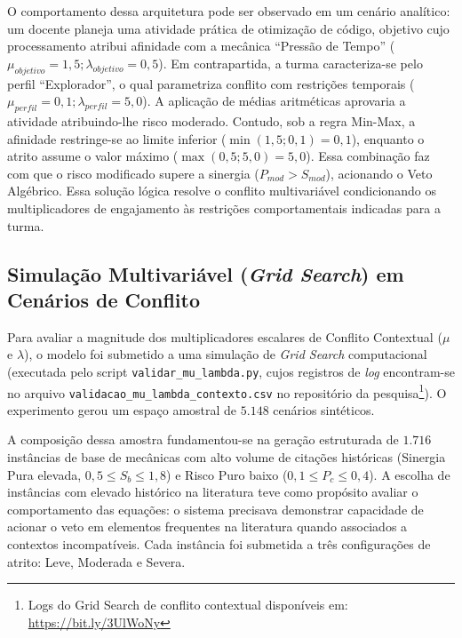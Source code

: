 O comportamento dessa arquitetura pode ser observado em um cenário analítico: um docente planeja uma atividade prática de otimização de código, objetivo cujo processamento atribui afinidade com a mecânica ``Pressão de Tempo'' ($\mu_{objetivo} = 1,5; \lambda_{objetivo} = 0,5$). Em contrapartida, a turma caracteriza-se pelo perfil ``Explorador'', o qual parametriza conflito com restrições temporais ($\mu_{perfil} = 0,1; \lambda_{perfil} = 5,0$). A aplicação de médias aritméticas aprovaria a atividade atribuindo-lhe risco moderado. Contudo, sob a regra Min-Max, a afinidade restringe-se ao limite inferior ($\min(1,5; 0,1) = 0,1$), enquanto o atrito assume o valor máximo ($\max(0,5; 5,0) = 5,0$). Essa combinação faz com que o risco modificado supere a sinergia ($P_{mod} > S_{mod}$), acionando o Veto Algébrico. Essa solução lógica resolve o conflito multivariável condicionando os multiplicadores de engajamento às restrições comportamentais indicadas para a turma.


\subsection{Simulação Multivariável (\textit{Grid Search}) em Cenários de Conflito}

Para avaliar a magnitude dos multiplicadores escalares de Conflito Contextual ($\mu$ e $\lambda$), o modelo foi submetido a uma simulação de \textit{Grid Search} computacional (executada pelo script \texttt{validar\_mu\_lambda.py}, cujos registros de \textit{log} encontram-se no arquivo \texttt{validacao\_mu\_lambda\_contexto.csv} no repositório da pesquisa\footnote{Logs do Grid Search de conflito contextual disponíveis em: \url{https://bit.ly/3UlWoNy}}). O experimento gerou um espaço amostral de $5.148$ cenários sintéticos.

A composição dessa amostra fundamentou-se na geração estruturada de $1.716$ instâncias de base de mecânicas com alto volume de citações históricas (Sinergia Pura elevada, $0,5 \le S_b \le 1,8$) e Risco Puro baixo ($0,1 \le P_c \le 0,4$). A escolha de instâncias com elevado histórico na literatura teve como propósito avaliar o comportamento das equações: o sistema precisava demonstrar capacidade de acionar o veto em elementos frequentes na literatura quando associados a contextos incompatíveis. Cada instância foi submetida a três configurações de atrito: Leve, Moderada e Severa.

